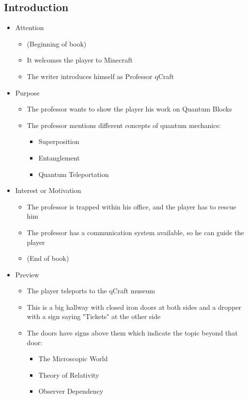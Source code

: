 \documentclass[11pt,twoside]{report} %
\begin{document}
\subsection{Introduction}

\begin{itemize}
	\item Attention
	\begin{itemize}
		\item (Beginning of book)
		\item It welcomes the player to Minecraft
		\item The writer introduces himself as Professor qCraft
	\end{itemize}
	\item Purpose
	\begin{itemize}
		\item The professor wants to show the player his work on Quantum Blocks
		\item The professor mentions different concepts of quantum mechanics:
		\begin{itemize}
			\item Superposition
			\item Entanglement
			\item Quantum Teleportation
		\end{itemize}
	\end{itemize}
	\item Interest or Motivation
	\begin{itemize}
		\item The professor is trapped within his office, and the player has to rescue him
		\item The professor has a communication system available, so he can guide the player
		\item (End of book)
	\end{itemize}
	\item Preview
	\begin{itemize}
		\item The player teleports to the qCraft museum
		\item This is a big hallway with closed iron doors at both sides and a dropper with a sign saying "Tickets" at the other side
		\item The doors have signs above them which indicate the topic beyond that door:
		\begin{itemize}
			\item The Microscopic World
			\item Theory of Relativity
			\item Observer Dependency

\end{itemize}
\end{itemize}
\end{itemize}
\end{document}
